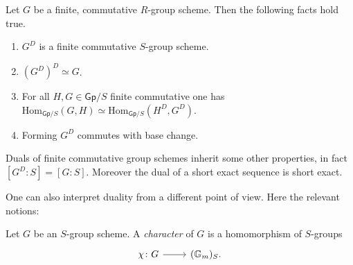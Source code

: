 \begin{thm}\label{thm:CartierDuality}
	Let $G$ be a finite, commutative $R$-group scheme.
	Then the following facts hold true.
\begin{enumerate}
	\item $G^D$ is a finite commutative $S$-group scheme.
	\item $( G^D )^D \simeq G$.
	\item For all $H,G \in \mathsf{Gp}/S$ finite commutative one has
	$\mathrm{Hom}_{\mathsf{Gp}/S} \left( G, H \right) \simeq
	\mathrm{Hom}_{\mathsf{Gp}/S} \left( H^D, G^D \right)$.
	\item Forming $G^D$ commutes with base change.
\end{enumerate}
\end{thm}


\begin{rem}[]\label{rem:DualityOtherProperties}
	Duals of finite commutative group schemes inherit some other properties,
	in fact $[G^D : S] = [G : S]$.
	Moreover the dual of a short exact sequence is short exact.
\end{rem}


\noindent
One can also interpret duality from a different point of view.
Here the relevant notions:
\begin{defn}
	Let $G$ be an $S$-group scheme.
	A {\em character} of $G$ is a homomorphism of $S$-groups
	\begin{equation*}
	\begin{tikzcd}[row sep = 0ex
		,/tikz/column 1/.append style={anchor=base east}
		,/tikz/column 2/.append style={anchor=base west}]
		\chi\colon G \arrow[r, "", rightarrow] &
		(\mathbb{G}_m)_S
	.\end{tikzcd}
	\end{equation*} 
\end{defn}



